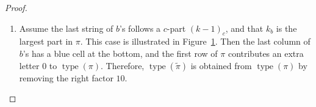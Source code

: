 \documentclass[11pt]{article}
\theoremstyle{definition}
\theoremstyle{remark}
\theoremstyle{definition}
\numberwithin{equation}{section}
\newcommand{\type}{\operatorname{type}}
\begin{document}
\begin{proof}
\begin{enumerate}[label=(2\alph*)]
\begin{figure}[h]
\begin{minipage}[t]{0.38\textwidth}
        \medskip
        {\small (2a)}
    \end{minipage}
    \begin{minipage}[t]{0.38\textwidth}
        \centering
        \hspace{0.35\textwidth}
        \(\scalebox{0.7}{\begin{ytableau}
*(blue) \scalebox{1.5}{\color{green}$c$} & *(green) \scalebox{1.5}{\color{blue}$b$} & *(green) \scalebox{1.5}{\color{blue}$a$} & *(blue) \scalebox{1.5}{\color{green}$b$} & 0 \\
*(green) \scalebox{1.5}{\color{blue}$a$} & *(blue) \scalebox{1.5}{\color{green}$b$} & *(blue) \scalebox{1.5}{\color{green}$c$} & *(green) \scalebox{1.5}{\color{blue}$b$}  \\
*(blue) \scalebox{1.5}{\color{green}$c$} & *(green) \scalebox{1.5}{\color{blue}$b$} & *(green) \scalebox{1.5}{\color{blue}$a$} & *(blue) \scalebox{1.5}{\color{green}$b$} \\
*(green) \scalebox{1.5}{\color{blue}$a$} & *(blue) \scalebox{1.5}{\color{green}$b$} & *(blue) \scalebox{1.5}{\color{green}$c$} \\
*(blue) \scalebox{1.5}{\color{green}$c$} & *(green) \scalebox{1.5}{\color{blue}$b$} \\
*(green) \scalebox{1.5}{\color{blue}$a$} & *(blue) \scalebox{1.5}{\color{green}$b$} \\
*(blue) \scalebox{1.5}{\color{green}$c$}
\end{ytableau}} \hspace{2em} \scalebox{0.7}{\begin{ytableau}
*(green) \scalebox{1.5}{\color{blue}$a$} & *(blue) \scalebox{1.5}{\color{green}$b$} & *(blue) \scalebox{1.5}{\color{green}$c$} \\
*(blue) \scalebox{1.5}{\color{green}$c$} & *(green) \scalebox{1.5}{\color{blue}$b$} \\
*(green) \scalebox{1.5}{\color{blue}$a$} & *(blue) \scalebox{1.5}{\color{green}$b$} \\
*(blue) \scalebox{1.5}{\color{green}$c$}
\end{ytableau}}\)

        \medskip
        {\small (2b)}
    \end{minipage}

    \caption{Inductive steps for cases (2a) and (2b).}
    \label{fig:sec4_2ab}
\end{figure}

\item Assume the last string of \(b\)’s follows a \(c\)-part \((k-1)_c\), and that \(k_b\) is the largest part in \(\pi\).  
This case is illustrated in Figure~\ref{fig:sec4_2ab}.  
Then the last column of \(b\)’s has a blue cell at the bottom, and the first row of \(\pi\) contributes an extra letter \(0\) to \(\type(\pi)\).  
Therefore, \(\type(\tilde{\pi})\) is obtained from \(\type(\pi)\) by removing the right factor \(10\).


\end{enumerate}
\end{proof}
\end{document}

